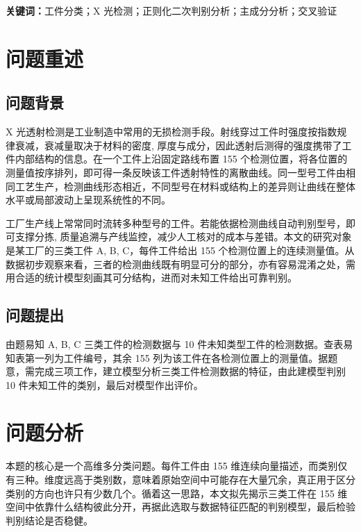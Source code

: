 \documentclass[12pt,a4paper]{article}
\newcommand{\jiacu}[1]{\textbf{\bfseries\heiti #1}}
\newcommand{\upcite}[1]{\cite{#1}}
\begin{document}
\bigskip

\noindent
\jiacu{关键词：}工件分类；X 光检测；正则化二次判别分析；主成分分析；交叉验证
\clearpage
\hypersetup{pageanchor=true}
\pagestyle{plain}

\section{问题重述}
\subsection{问题背景}

X 光透射检测是工业制造中常用的无损检测手段。射线穿过工件时强度按指数规律衰减，衰减量取决于材料的密度, 厚度与成分，因此透射后测得的强度携带了工件内部结构的信息\upcite{mery2015,zhanghui2022}。在一个工件上沿固定路线布置 155 个检测位置，将各位置的测量值按序排列，即可得一条反映该工件透射特性的离散曲线。同一型号工件由相同工艺生产，检测曲线形态相近，不同型号在材料或结构上的差异则让曲线在整体水平或局部波动上呈现系统性的不同。

工厂生产线上常常同时流转多种型号的工件。若能依据检测曲线自动判别型号，即可支撑分拣, 质量追溯与产线监控，减少人工核对的成本与差错。本文的研究对象是某工厂的三类工件 A, B, C，每件工件给出 155 个检测位置上的连续测量值。从数据初步观察来看，三者的检测曲线既有明显可分的部分，亦有容易混淆之处，需用合适的统计模型刻画其可分结构，进而对未知工件给出可靠判别。


\subsection{问题提出}

由题易知 A, B, C 三类工件的检测数据与 10 件未知类型工件的检测数据。查表易知表第一列为工件编号，其余 155 列为该工件在各检测位置上的测量值。据题意，需完成三项工作，建立模型分析三类工件检测数据的特征，由此建模型判别 10 件未知工件的类别，最后对模型作出评价。


\section{问题分析}

本题的核心是一个高维多分类问题。每件工件由 155 维连续向量描述，而类别仅有三种。维度远高于类别数，意味着原始空间中可能存在大量冗余，真正用于区分类别的方向也许只有少数几个。循着这一思路，本文拟先揭示三类工件在 155 维空间中依靠什么结构彼此分开，再据此选取与数据特征匹配的判别模型，最后检验判别结论是否稳健。
\end{document}
